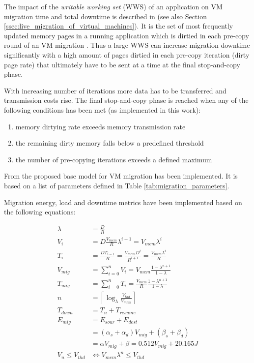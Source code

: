 The impact of the \textit{writable working set} (WWS) of an application on VM migration time and total downtime is described in \cite{clark2005live} (see also Section \ref{ssec:live_migration_of_virtual_machines}). It is the set of most frequently updated memory pages in a running application which is dirtied in each pre-copy round of an VM migration \cite{clark2005live, liu2013performance}. Thus a large WWS can increase migration downtime significantly with a high amount of pages dirtied in each pre-copy iteration (dirty page rate) that ultimately have to be sent at a time at the final stop-and-copy phase. 

With increasing number of iterations more data has to be transferred and transmission costs rise. The final stop-and-copy phase is reached when any of the following conditions has been met (as implemented in this work): 

\begin{enumerate}[label=\textnormal{(\arabic*)}]
	\item memory dirtying rate exceeds memory transmission rate \label{itm:condition1}
	\item the remaining dirty memory falls below a predefined threshold \label{itm:condition2}
	\item the number of pre-copying iterations exceeds a defined maximum \label{itm:condition3}
\end{enumerate}

From \cite{liu2013performance} the proposed base model for VM migration has been implemented. It is based on a list of parameters defined in Table \ref{tab:migration_parameters}. 

Migration energy, load and downtime metrics have been implemented based on the following equations: 

\begin{align}
	\lambda &= \frac{D}{R} \label{eq:m_lambda} \\
	V_i &= D \frac{V_{mem}}{R} \lambda^{i-1} = V_{mem} \lambda^i \label{eq:m_v_i} \\
	T_i &= \frac{D T_{i-1}}{R} = \frac{V_{mem} D^i}{R^{i+1}} = \frac{V_{mem} \lambda^i}{R} \label{eq:m_t_i} \\
	V_{mig} &= \sum_{i=0}^n V_i = V_{mem} \frac{1 - \lambda^{n+1}}{1 - \lambda} \label{eq:m_v_mig} \\
	T_{mig} &= \sum_{i=0}^n T_i = \frac{V_{mem}}{R} \frac{1 - \lambda^{n+1}}{1 - \lambda} \label{eq:m_t_mig} \\
	n &= \left\lceil \log_{\lambda} \frac{V_{thd}}{V_{mem}} \right\rceil \label{eq:m_n} \\
	T_{down} &= T_n + T_{resume} \label{eq:m_t_down} \\
	E_{mig} &= E_{sour} + E_{dest} \label{eq:m_e_mig} \\
	&= (\alpha_s + \alpha_d) V_{mig} + (\beta_s + \beta_d) \nonumber \\
	&= \alpha V_{mig} + \beta = 0.512 V_{mig} + 20.165 J \nonumber \\
	V_n \le V_{thd} &\Leftrightarrow V_{mem} \lambda^n \le V_{thd} \label{eq:m_v_n}
\end{align}


